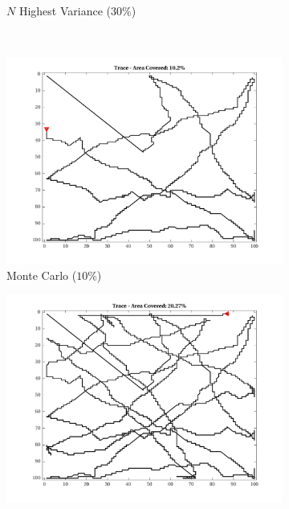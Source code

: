 \begin{figure}[htb!]
\begin{subfigure}[t]{0.32\textwidth}
        \caption{$N$ Highest Variance ($30\%$)}
    \end{subfigure}%
    \\
    \begin{subfigure}[t]{0.32\textwidth}
        \centering
        \includegraphics[width=\linewidth]{figures/hbresults/path_mc_10p_100x100_sf_50_seed_2.png}
        \ssp
        \captionsetup{skip=0.20\baselineskip,size=footnotesize}
        \caption{Monte Carlo ($10\%$)}
    \end{subfigure}%
    \begin{subfigure}[t]{0.32\textwidth}
        \centering
        \includegraphics[width=\linewidth]{figures/hbresults/path_mc_20p_100x100_sf_50_seed_2.png}
        \ssp

\end{subfigure}
\end{figure}
